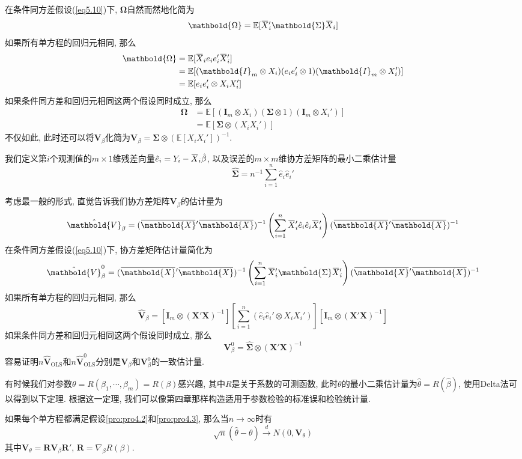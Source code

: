 \documentclass[cn, 12pt, math=mtpro2, bibstyle=apa, blue, twocol]{elegantbook}
\newcommand{\RH}{\mathbold{R}}
\newcommand{\E}{\mathbb{E}}
\newcommand{\X}{\mathbold{X}}
\newcommand{\hb}{\hat{\beta}}
\newcommand{\V}{\mathbold{V}}
\newcommand{\overbar}[1]{\mkern 1.5mu\overline{\mkern-1.5mu#1\mkern-1.5mu}\mkern 1.5mu}
\begin{document}
\begin{example}[协方差矩阵的化简]
在条件同方差假设(\ref{eq5.10})下, $\mathbold{\Omega}$自然而然地化简为
$$\mathbold{\Omega}=\E[\overbar{X}_i'\mathbold{\Sigma}\overbar{X}_i]$$
如果所有单方程的回归元相同, 那么
\begin{align*}
\mathbold{\Omega}&=\E[\overbar{X}_ie_ie_i'\overbar{X}_i'] \\
&=\E[(\mathbold{I}_m\otimes X_i)(e_ie_i'\otimes 1)(\mathbold{I}_m\otimes X_i')] \\
&=\E[e_ie_i'\otimes X_iX_i']
\end{align*}
如果条件同方差和回归元相同这两个假设同时成立, 那么
\begin{align*}
\mathbold{\Omega}&=\E[(\mathbold{I}_m\otimes X_i)(\mathbold{\Sigma}\otimes1)(\mathbold{I}_m\otimes X_i')] \\
&=\E[\mathbold{\Sigma}\otimes(X_iX_i')]
\end{align*}
不仅如此, 此时还可以将$\V_\beta$化简为$\V_\beta=\mathbold{\Sigma}\otimes(\E[X_iX_i'])^{-1}$.
\end{example}

\begin{example}[协方差矩阵的估计]
我们定义第$i$个观测值的$m\times1$维残差向量$\hat{e}_i=Y_i-\overbar{X}_i\hb$, 以及误差的$m\times m$维协方差矩阵的最小二乘估计量
\begin{equation}\label{eq5.14}
  \hat{\mathbold{\Sigma}}=n^{-1}\sum_{i=1}^{n}\hat{e}_i\hat{e}_i'
\end{equation}

考虑最一般的形式, 直觉告诉我们协方差矩阵$\V_\beta$的估计量为
$$\hat{\V}_{\beta}=(\overbar{\X}'\overbar{\X})^{-1}\left(\sum_{i=1}^{n}\overbar{X}_i'\hat{e}_i\hat{e}_i\overbar{X}_i'\right)(\overbar{\X}'\overbar{\X})^{-1}$$
在条件同方差假设(\ref{eq5.10})下, 协方差矩阵估计量简化为
$$\hat{\V}_{\beta}^0=(\overbar{\X}'\overbar{\X})^{-1}\left(\sum_{i=1}^{n}\overbar{X}_i'\hat{\mathbold{\Sigma}}\overbar{X}_i'\right)(\overbar{\X}'\overbar{\X})^{-1}$$
如果所有单方程的回归元相同, 那么
$$\hat{\V}_{\beta}=[\mathbold{I}_m\otimes(\X'\X)^{-1}]\left[\sum_{i=1}^{n}(\hat{e}_i\hat{e}_i'\otimes X_iX_i')\right][\mathbold{I}_m\otimes(\X'\X)^{-1}]$$
如果条件同方差和回归元相同这两个假设同时成立, 那么
$$\V_{\beta}^0=\hat{\mathbold{\Sigma}}\otimes(\X'\X)^{-1}$$
容易证明$n\hat{\V}_{\text{OLS}}$和$n\hat{\V}_{\text{OLS}}^0$分别是$\V_\beta$和$\V_\beta^0$的一致估计量.
\end{example}

有时候我们对参数$\theta=R(\beta_1,\cdots,\beta_m)=R(\beta)$感兴趣, 其中$R$是关于系数的可测函数, 此时$\theta$的最小二乘估计量为$\hat{\theta}=R(\hb)$, 使用Delta法可以得到以下定理. 根据这一定理, 我们可以像第四章那样构造适用于参数检验的标准误和检验统计量.
\begin{theorem}
  如果每个单方程都满足假设\ref{pro:pro4.2}和\ref{pro:pro4.3}, 那么当$n\to\infty$时有
  $$\sqrt{n}(\hat{\theta}-\theta)\xrightarrow{d}N(0,\V_\theta)$$
  其中$\V_\theta=\RH\V_\beta\RH'$, $\displaystyle\RH=\nabla_\beta R(\beta)$.
\end{theorem}
\end{document}
